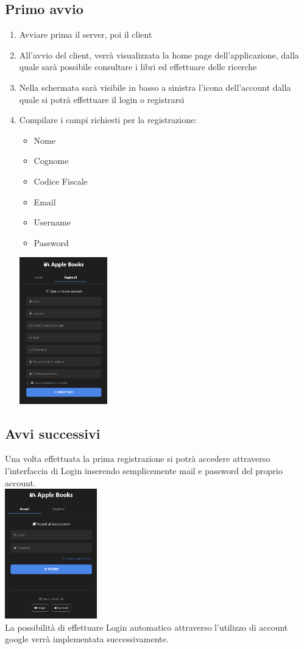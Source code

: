 \documentclass[12pt,a4paper]{article}
\begin{document}
\subsection{Primo avvio}

\begin{enumerate}
    \item Avviare prima il server, poi il client
    \item All'avvio del client, verrà visualizzata la home page dell'applicazione, dalla quale sarà possibile consultare i libri ed effettuare delle ricerche
    \item Nella schermata sarà visibile in basso a sinistra l'icona dell'account dalla quale si potrà effettuare il login o registrarsi
    \item Compilare i campi richiesti per la registrazione:
    \begin{itemize}
        \item Nome
        \item Cognome
        \item Codice Fiscale
        \item Email
        \item Username
        \item Password
    \end{itemize}
    \includegraphics[width=0.3\textwidth]{img/registrati.PNG}
\end{enumerate}

\subsection{Avvi successivi}

Una volta effettuata la prima registrazione si potrà accedere attraverso l'interfaccia di Login inserendo semplicemente mail e password del proprio account.
\\
\includegraphics[width=0.3\textwidth]{img/accedi.PNG}
\\
La possibilità di effettuare Login automatico attraverso l'utilizzo di account google verrà implementata successivamente.
\end{document}
